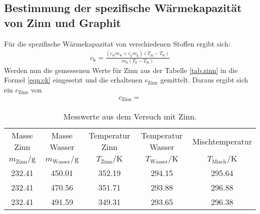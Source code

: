 \subsection{Bestimmung der spezifische Wärmekapazität von Zinn und Graphit}
Für die spezifische Wärmekapazitat von verschiedenen Stoffen ergibt sich:
\begin{align}
c_\mathrm{k}=\frac{(c_\mathrm{w} m_\mathrm{w}+c_\mathrm{g} m_\mathrm{g})(T_\mathrm{m}-T_\mathrm{w})}{m_\mathrm{k}(T_\mathrm{k}-T_\mathrm{m})}\label{eqn:ck}
\end{align}
Werden nun die gemessenen Werte für Zinn aus der Tabelle \ref{tab.zinn} in die Formel \eqref{eqn:ck} eingesetzt und die erhaltenen $c_{\mathrm{Zinn}}$ gemittelt.
Daraus ergibt sich ein $c_{\mathrm{Zinn}}$ von
\begin{align*}
c_\mathrm{Zinn} =
\end{align*}
\begin{table}
  \centering
  \caption{Messwerte aus dem Versuch mit Zinn.}
  \label{tab:zinn}
   \begin{tabular}{c c c c c}
\toprule
Masse Zinn & Masse Wasser & Temperatur Zinn & Temperatur Wasser  & Mischtemperatur \\
$m_\mathrm{Zinn}/\si{\gram}$ & $m_\mathrm{Wasser}/\si{\gram}$ & $T_\mathrm{Zinn}/\si{\kelvin}$ & $T_\mathrm{Wasser}/\si{\kelvin}$ & $T_\mathrm{Misch}/\si{\kelvin}$ \\
\midrule
     232.41 &   450.01 &  352.19 &   294.15  &   295.64 \\
     232.41 &   470.56 &  351.71 &   293.88  &   296.88 \\
     232.41 &   491.59 &  349.31 &   293.65  &   296.38 \\
\bottomrule
\end{tabular}
\end{table}
